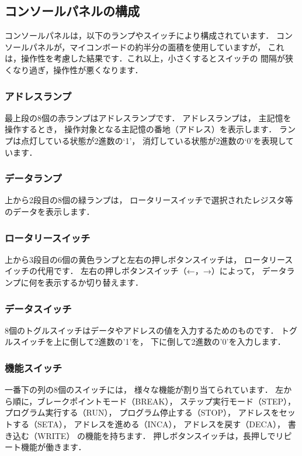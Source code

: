 \subsection{コンソールパネルの構成}
コンソールパネルは，以下のランプやスイッチにより構成されています．
コンソールパネルが，マイコンボードの約半分の面積を使用していますが，
これは，操作性を考慮した結果です．これ以上，小さくするとスイッチの
間隔が狭くなり過ぎ，操作性が悪くなります．

\subsubsection{アドレスランプ}
最上段の8個の赤ランプはアドレスランプです．
アドレスランプは，
主記憶を操作するとき，
操作対象となる主記憶の番地（アドレス）を表示します．
ランプは点灯している状態が2進数の`1'，
消灯している状態が2進数の`0'を表現しています．

\subsubsection{データランプ}
上から2段目の8個の緑ランプは，
ロータリースイッチで選択されたレジスタ等のデータを表示します．

\subsubsection{ロータリースイッチ}
上から3段目の6個の黄色ランプと左右の押しボタンスイッチは，
ロータリースイッチの代用です．
左右の押しボタンスイッチ（←，→）によって，
データランプに何を表示するか切り替えます．

\subsubsection{データスイッチ}
8個のトグルスイッチはデータやアドレスの値を入力するためのものです．
トグルスイッチを上に倒して2進数の'1'を，
下に倒して2進数の'0'を入力します．

\subsubsection{機能スイッチ}
一番下の列の8個のスイッチには，
様々な機能が割り当てられています．
左から順に，ブレークポイントモード（BREAK），
ステップ実行モード（STEP），
プログラム実行する（RUN），
プログラム停止する（STOP），
アドレスをセットする（SETA），
アドレスを進める（INCA），
アドレスを戻す（DECA），
書き込む（WRITE）
の機能を持ちます．
押しボタンスイッチは，長押しでリピート機能が働きます．

